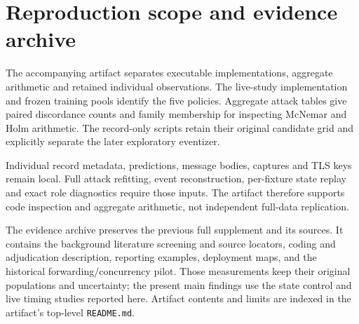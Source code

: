 \section{Reproduction scope and evidence archive}
The accompanying artifact separates executable implementations, aggregate arithmetic and retained individual observations. The live-study implementation and frozen training pools identify the five policies. Aggregate attack tables give paired discordance counts and family membership for inspecting McNemar and Holm arithmetic. The record-only scripts retain their original candidate grid and explicitly separate the later exploratory eventizer.

Individual record metadata, predictions, message bodies, captures and TLS keys remain local. Full attack refitting, event reconstruction, per-fixture state replay and exact role diagnostics require those inputs. The artifact therefore supports code inspection and aggregate arithmetic, not independent full-data replication.

The evidence archive preserves the previous full supplement and its sources. It contains the background literature screening and source locators, coding and adjudication description, reporting examples, deployment maps, and the historical forwarding/concurrency pilot. Those measurements keep their original populations and uncertainty; the present main findings use the state control and live timing studies reported here. Artifact contents and limits are indexed in the artifact's top-level \texttt{README.md}.
